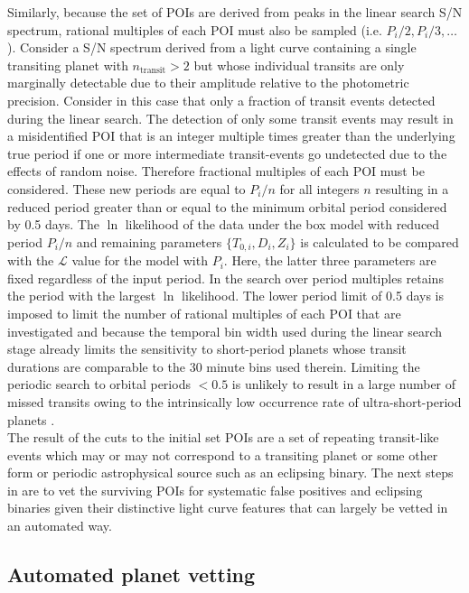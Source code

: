 Similarly, because the set of POIs are derived from peaks in the linear search S/N spectrum, 
rational multiples of each POI must also be sampled (i.e. $P_i/2,P_i/3,\dots$).
Consider a S/N spectrum derived from a light curve containing a single transiting planet with
$n_{\text{transit}}>2$ but whose individual transits are only marginally detectable  due to their
amplitude relative to the photometric precision. Consider in this case that only a fraction of
transit events detected during the linear search.
The detection of only some transit events may result in a misidentified
POI that is an integer multiple times greater than the underlying true period if one or more
intermediate transit-events go undetected due to the effects of random noise.
Therefore fractional multiples of each POI must be considered. These new periods are equal to
$P_i/n$ for all integers $n$ resulting in a reduced period greater than or equal to the minimum
orbital period considered by \pipeline{:} 0.5 days. The $\ln$ likelihood of the data under
the box model with reduced period $P_i/n$ and remaining parameters $\{T_{0,i},D_i,Z_i\}$ is calculated
to be compared with the $\mathcal{L}$ value for the model with $P_i$. Here, the latter three parameters
are fixed regardless of the input period. In the search over period
multiples retains the period with the largest $\ln$ likelihood.
The lower period limit of 0.5 days is imposed to limit the number of rational multiples of each POI that
are investigated and because the temporal bin width used during the linear search stage already limits
the sensitivity to short-period planets whose transit durations are comparable to the 30 minute bins used
therein. Limiting the periodic search to orbital periods $< 0.5$ is
unlikely to result in a large number of missed transits owing to the intrinsically low occurrence rate of
ultra-short-period planets \citep[$\lesssim 1$\%;][]{sanchisojeda14,adams16}. \\

The result of the cuts to the initial set POIs are a set of repeating transit-like events which may or
may not correspond to a transiting planet or some other form or periodic astrophysical source
such as an eclipsing binary. The next steps in \pipeline{} are to vet the surviving POIs for systematic
false positives and eclipsing binaries given their distinctive light curve features that can largely
be vetted in an automated way.


\subsection{Automated planet vetting} \label{sect:vetting}

